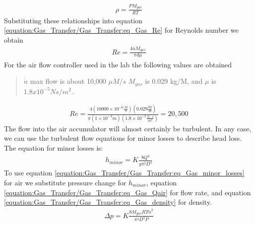 \documentclass[letterpaper,10pt,english]{sphinxmanual}
\begin{document}
\begin{equation}\label{equation:Gas_Transfer/Gas_Transfer:eq_Gas_density}
\begin{split} \rho =\frac{PM_{gas} }{RT}\end{split}
\end{equation}
Substituting these relationships into equation \eqref{equation:Gas_Transfer/Gas_Transfer:eq_Gas_Re} for Reynolds number we obtain
\begin{equation}\label{equation:Gas_Transfer/Gas_Transfer:Gas_Transfer/Gas_Transfer:11}
\begin{split}{Re}=\frac{4\dot{n}M_{gas} }{\pi d\mu }\end{split}
\end{equation}
For the air flow controller used in the lab the following values are obtained
\begin{quote}

\(\dot{n}\) max flow is about 10,000 \(\mu M/s\) \(M_{gas}\) is 0.029 kg/M, and \(\mu\) is \(1.8 x 10^{-5} Ns/m^2\).
\end{quote}
\begin{equation}\label{equation:Gas_Transfer/Gas_Transfer:Gas_Transfer/Gas_Transfer:12}
\begin{split}{Re}=\frac{4\left(10000\times 10^{-6} \frac{M}{s} \right)\left(0.029\frac{kg}{M} \right)}{\pi \left(1\times 10^{-3} m\right)\left(1.8\times 10^{-5} \frac{N\cdot s}{m^{2} } \right)} =20,500\end{split}
\end{equation}
The flow into the air accumulator will almost certainly be turbulent. In any case, we can use the turbulent flow equations for minor losses to describe head loss. The equation for minor losses is:
\begin{equation}\label{equation:Gas_Transfer/Gas_Transfer:eq_Gas_minor_losses}
\begin{split} h_{minor} =K\frac{8Q^{2} }{g\pi ^{2} D^{4} }\end{split}
\end{equation}
To use equation \eqref{equation:Gas_Transfer/Gas_Transfer:eq_Gas_minor_losses} for air we substitute pressure change for \(h_{minor}\), equation \eqref{equation:Gas_Transfer/Gas_Transfer:eq_Gas_Qair} for flow rate, and equation \eqref{equation:Gas_Transfer/Gas_Transfer:eq_Gas_density} for density.
\begin{equation}\label{equation:Gas_Transfer/Gas_Transfer:eq_Gas_minor_losses_for_gas}
\begin{split} \Delta p=K\frac{8M_{gas} RT\dot{n}^{2} }{\pi ^{2} D^{4} P}\end{split}
\end{equation}
\end{document}
